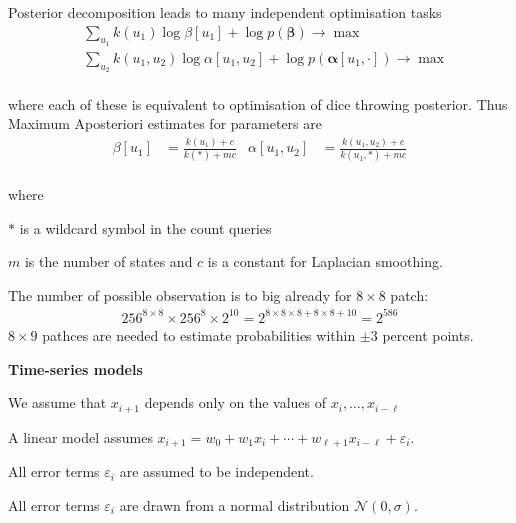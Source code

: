 \documentclass[landscape,footrule]{foils}
\renewcommand{\vec}[1]{\boldsymbol{#1}}
\begin{document}
\enlargethispage{4cm}
Posterior decomposition leads to many independent optimisation tasks\vspace*{-2ex}
\begin{align*}
&\sum_{u_1} k(u_1)\log \beta[u_1] + \log p(\vec{\beta})\to\max\\
&\sum_{u_2} k(u_1,u_2)\log\alpha[u_1,u_2]+\log p(\vec{\alpha}[u_1,\cdot])\to\max 
\end{align*}\vspace*{-4ex} \ \\
where each of these is equivalent to optimisation of dice throwing posterior. 
Thus Maximum Aposteriori estimates for parameters are \vspace*{-2ex}
\begin{align*}
\beta[u_1]&=\frac{k(u_1)+c}{k(*)+mc} &
\alpha[u_1,u_2]&=\frac{k(u_1,u_2)+c}{k(u_1,*)+mc}
\end{align*}\vspace*{-4ex}\ \\
where
\begin{triangles}
\item $*$ is a wildcard symbol in the count queries
\item $m$ is the number of  states and $c$ is a constant for Laplacian smoothing. 
\end{triangles}

\enlargethispage{0.5cm}

The number of possible observation is to big already for $8\times 8$ patch:
\begin{align*}
256^{8\times 8}\times 256^{8}\times 2^{10} = 2^{8\times 8\times 8+ 8\times 8 +10}= 2^{586}
\end{align*}
$8\times 9$ pathces are needed to estimate probabilities within $\pm 3$ percent points.



\textbf{Time-series models}
\begin{triangles}
\item We assume that $x_{i+1}$ depends only on the values of $x_i, \ldots, x_{i-\ell}$ 
\item A linear model assumes $x_{i+1}=w_0+w_{1}x_i+\cdots+ w_{\ell+1} x_{i-\ell}+\varepsilon_i$.
\item All error terms $\varepsilon_i$ are assumed to be independent.
\item  All error terms $\varepsilon_i$ are drawn from a normal distribution $\mathcal{N}(0,\sigma)$.
\end{triangles}
\end{document}
